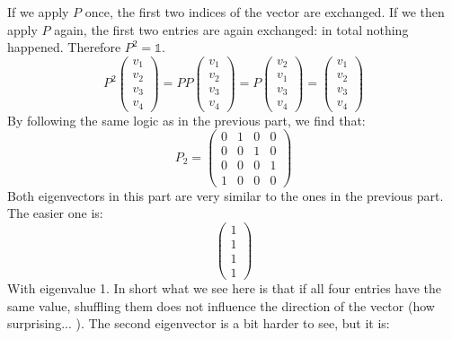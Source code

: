 \documentclass[a4paper]{report}
\begin{document}
\begin{Answer}[ref=eigen3]
\begin{equation*}
\end{equation*} 
\Question If we apply $P$ once, the first two indices of the vector are exchanged. If we then apply $P$ again, the first two entries are again exchanged: in total nothing happened. Therefore $P^2 = \mathbb{1}$.
\begin{equation*}
P^2 \begin{pmatrix} v_1 \\ v_2 \\ v_3 \\ v_4 \end{pmatrix} = P P \begin{pmatrix} v_1 \\ v_2 \\ v_3 \\ v_4 \end{pmatrix} = P \begin{pmatrix} v_2 \\ v_1 \\ v_3 \\ v_4 \end{pmatrix} =  \begin{pmatrix} v_1 \\ v_2 \\ v_3 \\ v_4 \end{pmatrix} 
\end{equation*}
\vspace{0.5ex}
\ExePart
\Question By following the same logic as in the previous part, we find that:
\begin{equation*}
P_2 = \begin{pmatrix} 	0 &  1 & 0 & 0 \\ 
				0 & 0 & 1 & 0 \\ 
				0 & 0 & 0& 1 \\ 
				1 & 0 & 0 & 0 \end{pmatrix}
\end{equation*}
\Question Both eigenvectors in this part are very similar to the ones in the previous part. The easier one is:
\begin{equation*}
\begin{pmatrix} 1 \\ 1 \\ 1 \\ 1 \end{pmatrix}
\end{equation*} 
With eigenvalue 1. In short what we see here is that if all four entries have the same value, shuffling them does not influence the direction of the vector (how surprising... ). The second eigenvector is a bit harder to see, but it is:

\end{Answer}
\end{document}

